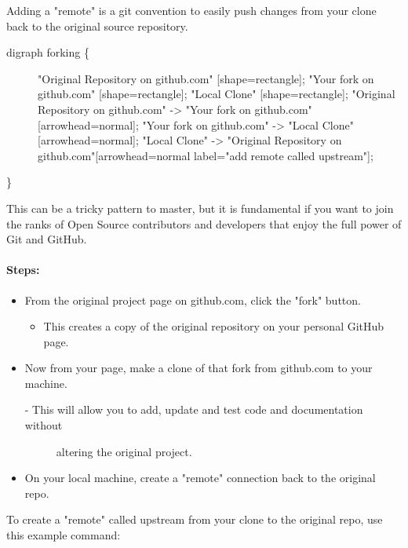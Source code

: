 Adding a "remote" is a git convention to easily push changes from your
clone back to the original source repository.

\begin{description}
\item[digraph forking \{]
"Original Repository on github.com" {[}shape=rectangle{]}; "Your fork on
github.com" {[}shape=rectangle{]}; "Local Clone" {[}shape=rectangle{]};
"Original Repository on github.com" -\textgreater{} "Your fork on
github.com"{[}arrowhead=normal{]}; "Your fork on github.com"
-\textgreater{} "Local Clone"{[}arrowhead=normal{]}; "Local Clone"
-\textgreater{} "Original Repository on github.com"{[}arrowhead=normal
label="add remote called upstream"{]};
\end{description}

\}

This can be a tricky pattern to master, but it is fundamental if you
want to join the ranks of Open Source contributors and developers that
enjoy the full power of Git and GitHub.


\paragraph{Steps:}

\begin{itemize}

\item
  From the original project page on github.com, click the "fork" button.

  \begin{itemize}

  \item
    This creates a copy of the original repository on your personal
    GitHub page.
  \end{itemize}
\item
  Now from your page, make a clone of that fork from github.com to your
  machine.

  \begin{description}
  \item[- This will allow you to add, update and test code and
  documentation without]
  altering the original project.
  \end{description}
\item
  On your local machine, create a "remote" connection back to the
  original repo.
\end{itemize}

To create a "remote" called upstream from your clone to the original
repo, use this example command:

